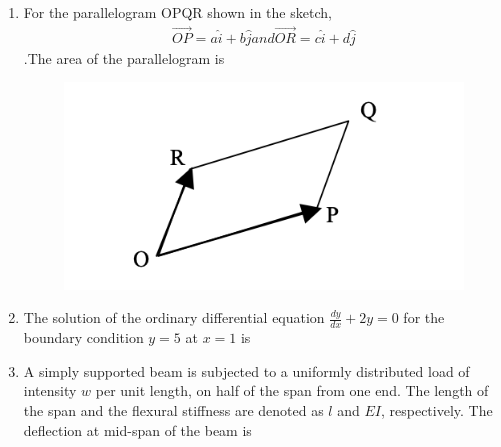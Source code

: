 \documentclass[journal]{IEEEtran}
\begin{document}
\begin{enumerate}
\item For the parallelogram OPQR shown in the sketch, 
\begin{align}
\overrightarrow{OP}=a\hat{i}+b\hat{j} and \overrightarrow{OR}=c\hat{i}+d\hat{j}
\end{align}
.The area of the parallelogram is \hfill {}
\begin{figure}[H]
    \centering
    \includegraphics[width=0.3\columnwidth]{figs/Q29.png} 
    \caption{}
    \label{fig:placeholder}
\end{figure}
\begin{enumerate}
\end{enumerate}

\item The solution of the ordinary differential equation $\frac{dy}{dx}+2y=0$ for the boundary condition $y=5$ at $x=1$ is \hfill {}
\begin{enumerate}
\end{enumerate}

\item A simply supported beam is subjected to a uniformly distributed load of intensity $w$ per unit length, on half of the span from one end. The length of the span and the flexural stiffness are denoted as $l$ and $EI$, respectively. The deflection at mid-span of the beam is \hfill {}
\begin{enumerate}
\end{enumerate}


\end{enumerate}
\end{document}
